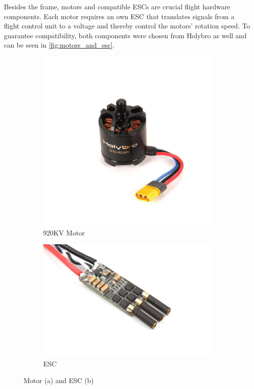 \FloatBarrier
\noindent Besides the frame, motors and compatible \acp{ESC} are crucial 
flight hardware components.
Each motor requires an own \ac{ESC} that translates signals from a flight 
control unit to a voltage and thereby control the motors' rotation speed.
To guarantee compatibility, both components were chosen from Holybro as well
and can be seen in \autoref{fig:motors_and_esc}.
\begin{figure}[!h]
    \begin{subfigure}[b]{0.48\textwidth}
        \includegraphics*[scale=0.15]{motor.jpg}
        \caption{920KV Motor}
        \label{subfig:motor_picture}
    \end{subfigure}
    \hfill
    \begin{subfigure}[b]{0.5\textwidth}
        \includegraphics*[scale=0.15]{esc.jpg}
        \caption{\acl*{ESC}}
        \label{subfig:esc_picture}
    \end{subfigure}
    \caption[Motor and \acs*{ESC}]{Motor (a) and \acs*{ESC} (b)}
    \label{fig:motors_and_esc}
\end{figure}
